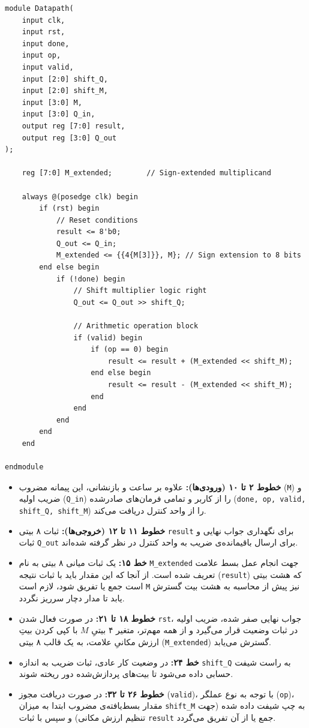 \documentclass[11pt,a4paper]{article}
\begin{document}
\begin{LTR}
\begin{lstlisting}[title={\rl{کد پیمانه مسیر داده}}]
module Datapath(
    input clk,
    input rst,
    input done,
    input op,
    input valid, 
    input [2:0] shift_Q,
    input [2:0] shift_M,
    input [3:0] M,
    input [3:0] Q_in,
    output reg [7:0] result,
    output reg [3:0] Q_out
);

    reg [7:0] M_extended;        // Sign-extended multiplicand

    always @(posedge clk) begin
        if (rst) begin
            // Reset conditions
            result <= 8'b0;
            Q_out <= Q_in;
            M_extended <= {{4{M[3]}}, M}; // Sign extension to 8 bits
        end else begin
            if (!done) begin
                // Shift multiplier logic right
                Q_out <= Q_out >> shift_Q;
                
                // Arithmetic operation block
                if (valid) begin
                    if (op == 0) begin
                        result <= result + (M_extended << shift_M);
                    end else begin
                        result <= result - (M_extended << shift_M);
                    end
                end
            end
        end
    end

endmodule
\end{lstlisting}
\end{LTR}

\begin{itemize}
    \item \textbf{خطوط ۲ تا ۱۰ (ورودی‌ها):} علاوه بر ساعت و بازنشانی، این پیمانه مضروب (\verb|M|) و ضریب اولیه (\verb|Q_in|) را از کاربر و تمامی فرمان‌های صادرشده (\verb|done, op, valid, shift_Q, shift_M|) را از واحد کنترل دریافت می‌کند.
    \item \textbf{خطوط ۱۱ تا ۱۲ (خروجی‌ها):} ثبات ۸ بیتی \verb|result| برای نگهداری جواب نهایی و ثبات \verb|Q_out| برای ارسال باقیمانده‌ی ضریب به واحد کنترل در نظر گرفته شده‌اند.
    \item \textbf{خط ۱۵:} یک ثبات میانی ۸ بیتی به نام \verb|M_extended| جهت انجام عمل بسط علامت تعریف شده است. از آنجا که این مقدار باید با ثبات نتیجه (\verb|result|) که هشت بیتی است جمع یا تفریق شود، لازم است \verb|M| نیز پیش از محاسبه به هشت بیت گسترش یابد تا مدار دچار سرریز نگردد.
    \item \textbf{خطوط ۱۸ تا ۲۱:} در صورت فعال شدن \verb|rst|، جواب نهایی صفر شده، ضریب اولیه در ثبات وضعیت قرار می‌گیرد و از همه مهم‌تر، متغیر ۴ بیتیِ $M$ با کپی کردن بیتِ ارزش مکانیِ علامت، به یک قالب ۸ بیتی (\verb|M_extended|) گسترش می‌یابد.
    \item \textbf{خط ۲۴:} در وضعیت کار عادی، ثبات ضریب به اندازه \verb|shift_Q| به راست شیفت حسابی داده می‌شود تا بیت‌های پردازش‌شده دور ریخته شوند.
    \item \textbf{خطوط ۲۶ تا ۳۲:} در صورت دریافت مجوز (\verb|valid|)، با توجه به نوع عملگر (\verb|op|)، مقدار بسط‌یافته‌ی مضروب ابتدا به میزان \verb|shift_M| به چپ شیفت داده شده (جهت تنظیم ارزش مکانی) و سپس با ثبات \verb|result| جمع یا از آن تفریق می‌گردد.
\end{itemize}
\end{document}

